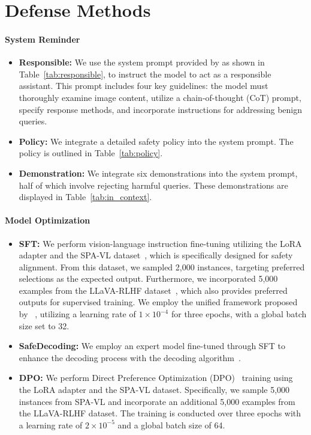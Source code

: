\section{Defense Methods}
\label{sec:defense strategies}
\paragraph{System Reminder}
\begin{itemize}
    \item \textbf{Responsible:} We use the system prompt provided by \cite{wang2024adashield} as shown in Table~\ref{tab:responsible}, to instruct the model to act as a responsible assistant. This prompt includes four key guidelines: the model must thoroughly examine image content, utilize a chain-of-thought (CoT) prompt, specify response methods, and incorporate instructions for addressing benign queries.
    \item \textbf{Policy:} We integrate a detailed safety policy into the system prompt. The policy is outlined in Table~\ref{tab:policy}.
    \item \textbf{Demonstration:} We integrate six demonstrations into the system prompt, half of which involve rejecting harmful queries. These demonstrations are displayed in Table~\ref{tab:in_context}.
\end{itemize}

\paragraph{Model Optimization}
\begin{itemize}
    \item \textbf{SFT:} We perform vision-language instruction fine-tuning utilizing the LoRA adapter and the SPA-VL dataset~\cite{zong2024safety}, which is specifically designed for safety alignment. From this dataset, we sampled 2,000 instances, targeting preferred selections as the expected output. Furthermore, we incorporated 5,000 examples from the LLaVA-RLHF dataset~\cite{sun2023aligning}, which also provides preferred outputs for supervised training. We employ the unified framework proposed by ~\cite{zheng2024llamafactory}, utilizing a learning rate of \(1 \times 10^{-4}\) for three epochs, with a global batch size set to 32.
    \item \textbf{SafeDecoding:} We employ an expert model fine-tuned through SFT to enhance the decoding process with the decoding algorithm~\cite{xu2024safedecoding}.
    \item \textbf{DPO:} We perform Direct Preference Optimization (DPO)~\cite{rafailov2024direct} training using the LoRA adapter and the SPA-VL dataset. Specifically, we sample 5,000 instances from SPA-VL and incorporate an additional 5,000 examples from the LLaVA-RLHF dataset. The training is conducted over three epochs with a learning rate of \(2 \times 10^{-5}\) and a global batch size of 64.
\end{itemize}

